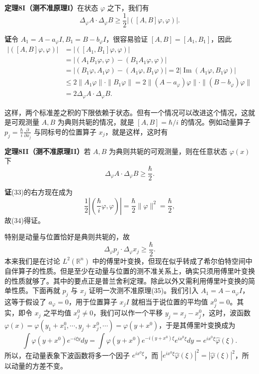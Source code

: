 \noindent\textbf{定理8I（测不准原理I）}\quad 在状态 $\varphi$ 之下，我们有
\begin{equation}
 \Delta_\varphi A\cdot\Delta_\varphi B
 \ge\frac12|([A,B]\varphi,\varphi)|.
 \tag{33}
\end{equation}

\noindent\textbf{证}\quad 令 $A_1=A-a_\varphi I,B_1=B-b_\varphi I$，很容易验证 $[A,B]=[A_1,B_1]$，因此
\[
 \begin{aligned}
 |([A,B]\varphi,\varphi)|
 &=|([A_1,B_1]\varphi,\varphi)|\\
 &=|(A_1B_1\varphi,\varphi)-(B_1A_1\varphi,\varphi)|\\
 &=|(B_1\varphi,A_1\varphi)-(A_1\varphi,B_1\varphi)|
 =2|\operatorname{Im}(A_1\varphi,B_1\varphi)|\\
 &\le2\|A_1\varphi\|\cdot\|B_1\varphi\|
 =2\|(A-a_\varphi)\varphi\|\cdot\|(B-b_\varphi)\varphi\|\\
 &=2\Delta_\varphi A\cdot\Delta_\varphi B.
 \end{aligned}
\]

这样，两个标准差之积的下限依赖于状态。但有一个情况可以改进这个情况，这就是可观测量 $A,B$ 为典则共轭的情况，就是 $[A,B]=\hbar/i$ 的情况。例如动量算子 $p_j=\frac\hbar i\frac\partial{\partial x_j}$ 与同标号的位置算子 $x_j$，就是这样，这时有

\noindent\textbf{定理8II（测不准原理II）}\quad 若 $A,B$ 为典则共轭的可观测量，则在任意状态 $\varphi(x)$ 下
\begin{equation}
 \Delta_\varphi A\cdot\Delta_\varphi B\ge\frac\hbar2.
 \tag{34}
\end{equation}

\noindent\textbf{证}\quad (33)的右方现在成为
\[
 \frac12\left|\left(\frac\hbar i\varphi,\varphi\right)\right|
 =\frac\hbar2\|\varphi\|^2=\frac\hbar2,
\]
故(34)得证。

特别是动量与位置恰好是典则共轭的，故
\begin{equation}
 \Delta_\varphi p_j\cdot\Delta_\varphi x_j\ge\frac\hbar2.
 \tag{35}
\end{equation}
本来我们是在讨论 $L^2(\mathbb R^n)$ 中的傅里叶变换，但现在似乎转成了希尔伯特空间中自伴算子的性质。但是至少在动量与位置的测不准关系上，确实只须用傅里叶变换的性质就够了。其中的要点正是普兰舍利定理。除此以外又需利用傅里叶变换的简单性质。下面再就 $p_j$ 与 $x_j$ 证明一次测不准原理(35)。我们引入 $A_1=A-a_\varphi I$，这等于假设了 $a_\varphi=0$，用于位置算子 $x_jI$ 就相当于说位置的平均值 $x_j^0=0$。其实，即令 $x_j$ 之平均值 $x_j^0\ne0$，我们可以作一个平移 $y_j=x_j-x_j^0$，这时，波函数 $\varphi(x)=\varphi(y_1+x_1^0,\cdots,y_j+x_j^0,\cdots)=\varphi(y+x^0)$，于是其傅里叶变换成为
\[
 \int\varphi(y+x^0)e^{-i\xi y}dy
 =\int\varphi(y+x^0)e^{-i(y+x^0)\xi}e^{ix^0\xi}dy
 =e^{ix^0\xi}\widehat\varphi(\xi).
\]
所以，在动量表象下波函数将多一个因子 $e^{ix^0\xi}$，而 $|e^{ix^0\xi}\widehat\varphi(\xi)|^2=|\widehat\varphi(\xi)|^2$，所以动量的方差不变。

